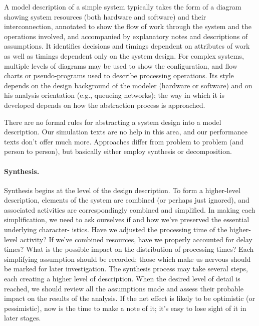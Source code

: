 A model description of a simple system typically takes the form of a diagram
showing system resources (both hardware and software) and their
interconnection, annotated to show the flow of work through the system and
the operations involved, and accompanied by explanatory notes and
descriptions of assumptions. It identifies decisions and timings dependent on
attributes of work as well as timings dependent only on the system design. For
complex systems, multiple levels of diagrams may be used to show the
configuration, and flow charts or pseudo-programs used to describe processing
operations. Its style depends on the design background of the modeler
(hardware or software) and on his analysis orientation (e.g., queueing
networks); the way in which it is developed depends on how the abstraction
process is approached.

There are no formal rules for abstracting a system design into a model
description. Our simulation texts are no help in this area, and our
performance texts don't offer much more. Approaches differ from problem to
problem (and person to person), but basically either employ synthesis or
 decomposition.

\paragraph{Synthesis.}
Synthesis begins at the level of the design description. To form a higher-level
description, elements of the system are combined (or perhaps just ignored),
and associated activities are correspondingly combined and simplified. In
making each simplification, we need to ask ourselves if and how we've
preserved the essential underlying character-
\noindent istics. Have we adjusted the
processing time of the higher-level activity? If we've combined resources,
have we properly accounted for delay times? What is the possible impact on
the distribution of processing times? Each simplifying assumption should be
recorded; those which make us nervous should be marked for later
investigation. The synthesis process may take several steps, each creating a
higher level of description. When the desired level of detail is reached, we
should review all the assumptions made and assess their probable impact on
the results of the analysis. If the net effect is likely to be optimistic (or
pessimistic), now is the time to make a note of it; it's easy to lose sight of
it in later stages.

